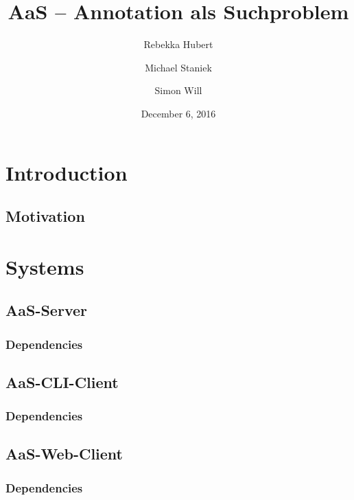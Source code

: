 \documentclass{scrartcl}
\title{AaS – Annotation als Suchproblem}
\author{Rebekka Hubert \and Michael Staniek \and Simon Will}
\date{December 6, 2016}
\begin{document}
\maketitle

\section{Introduction}
\label{sec:Introduction}

\subsection{Motivation}
\label{sub:Motivation}

\section{Systems}
\label{sec:Systems}

\subsection{AaS-Server}
\label{sub:AaS-Server}

\subsubsection{Dependencies}
\label{ssub:Server-Dependencies}

\subsection{AaS-CLI-Client}
\label{sub:AaS-CLI-Client}

\subsubsection{Dependencies}
\label{ssub:CLI-Client-Dependencies}

\subsection{AaS-Web-Client}
\label{sub:AaS-Web-Client}

\subsubsection{Dependencies}
\label{ssub:Web-Client-Dependencies}
\end{document}

